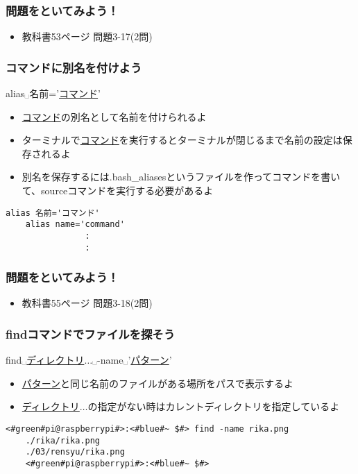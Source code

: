 \begin{frame}
    \frametitle{問題をといてみよう！}
    \begin{itemize}
        \item 教科書53ページ 問題3-17(2問)
    \end{itemize}
\end{frame}

\begin{frame}[fragile]
    \frametitle{コマンドに別名を付けよう}
    alias␣名前='\underline{コマンド}'
    \begin{itemize}
        \item \underline{コマンド}の別名として名前を付けられるよ
    \end{itemize}
    \begin{itemize}
        \item ターミナルで\underline{コマンド}を実行するとターミナルが閉じるまで名前の設定は保存されるよ
        \item 別名を保存するには.bash\_aliasesというファイルを作ってコマンドを書いて、sourceコマンドを実行する必要があるよ
    \end{itemize}
    \begin{lstlisting}[title=\textasciitilde/.bash\_aliasesの書き方, label=bashAliasesGrammar1]
    alias 名前='コマンド'
    alias name='command'
                :
                :
    \end{lstlisting}
\end{frame}

\begin{frame}
    \frametitle{問題をといてみよう！}
    \begin{itemize}
        \item 教科書55ページ 問題3-18(2問)
    \end{itemize}
\end{frame}

\begin{frame}[fragile]
    \frametitle{findコマンドでファイルを探そう}
    find␣\underline{ディレクトリ}$\ldots$␣-name␣'\underline{パターン}'
    \begin{itemize}
        \item \underline{パターン}と同じ名前のファイルがある場所をパスで表示するよ
        \item \underline{ディレクトリ}$\ldots$の指定がない時はカレントディレクトリを指定しているよ
    \end{itemize}
    \begin{lstlisting}[title=rika.pngをfindコマンドで探す]
    <#green#pi@raspberrypi#>:<#blue#~ $#> find -name rika.png
    ./rika/rika.png
    ./03/rensyu/rika.png
    <#green#pi@raspberrypi#>:<#blue#~ $#>
    \end{lstlisting}
\end{frame}

